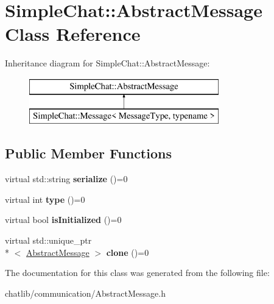 \hypertarget{classSimpleChat_1_1AbstractMessage}{\section{Simple\-Chat\-:\-:Abstract\-Message Class Reference}
\label{classSimpleChat_1_1AbstractMessage}
}
Inheritance diagram for Simple\-Chat\-:\-:Abstract\-Message\-:\begin{figure}[H]
\begin{center}
\leavevmode
\includegraphics[height=2.000000cm]{classSimpleChat_1_1AbstractMessage}
\end{center}
\end{figure}
\subsection*{Public Member Functions}
\begin{DoxyCompactItemize}
\item 
\hypertarget{classSimpleChat_1_1AbstractMessage_a6920d6c85c58836df0231dc928a7e89d}{virtual std\-::string {\bfseries serialize} ()=0}\label{classSimpleChat_1_1AbstractMessage_a6920d6c85c58836df0231dc928a7e89d}

\item 
\hypertarget{classSimpleChat_1_1AbstractMessage_adccc53225d21696f0c55fb336ce8f2b9}{virtual int {\bfseries type} ()=0}\label{classSimpleChat_1_1AbstractMessage_adccc53225d21696f0c55fb336ce8f2b9}

\item 
\hypertarget{classSimpleChat_1_1AbstractMessage_a626a708cc046249083273620d8db74d8}{virtual bool {\bfseries is\-Initialized} ()=0}\label{classSimpleChat_1_1AbstractMessage_a626a708cc046249083273620d8db74d8}

\item 
\hypertarget{classSimpleChat_1_1AbstractMessage_a7fae15db18e8572a7c58651b724636bb}{virtual std\-::unique\-\_\-ptr\\*
$<$ \hyperlink{classSimpleChat_1_1AbstractMessage}{Abstract\-Message} $>$ {\bfseries clone} ()=0}\label{classSimpleChat_1_1AbstractMessage_a7fae15db18e8572a7c58651b724636bb}

\end{DoxyCompactItemize}


The documentation for this class was generated from the following file\-:\begin{DoxyCompactItemize}
\item 
chatlib/communication/Abstract\-Message.\-h\end{DoxyCompactItemize}
